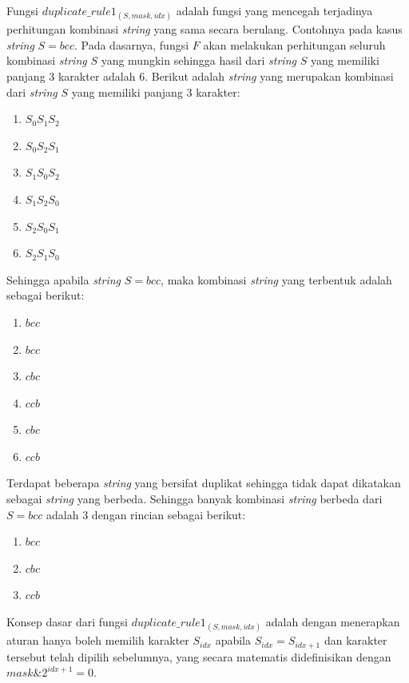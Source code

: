 Fungsi $ duplicate\_rule1_{(S, mask, idx)} $ adalah fungsi yang mencegah terjadinya perhitungan kombinasi \textit{string} yang sama secara berulang. Contohnya pada kasus \textit{string} $ S=bcc $. Pada dasarnya, fungsi $ F $ akan melakukan perhitungan seluruh kombinasi \textit{string} $ S $ yang mungkin sehingga hasil dari \textit{string} $ S $ yang memiliki panjang $ 3 $ karakter adalah $ 6 $. Berikut adalah \textit{string} yang merupakan kombinasi dari \textit{string} $ S $ yang memiliki panjang 3 karakter:
\begin{enumerate}
	\item $ S_{0}S_{1}S_{2} $
	\item $ S_{0}S_{2}S_{1} $
	\item $ S_{1}S_{0}S_{2} $
	\item $ S_{1}S_{2}S_{0} $
	\item $ S_{2}S_{0}S_{1} $
	\item $ S_{2}S_{1}S_{0} $
\end{enumerate}

Sehingga apabila \textit{string} $ S=bcc $, maka kombinasi \textit{string} yang terbentuk adalah sebagai berikut:
\begin{enumerate}
	\item $ bcc $
	\item $ bcc $
	\item $ cbc $
	\item $ ccb $
	\item $ cbc $
	\item $ ccb $
\end{enumerate}

Terdapat beberapa \textit{string} yang bersifat duplikat sehingga tidak dapat dikatakan sebagai \textit{string} yang berbeda. Sehingga banyak kombinasi \textit{string} berbeda dari $ S=bcc $ adalah $ 3 $ dengan rincian sebagai berikut:
\begin{enumerate}
	\item $ bcc $
	\item $ cbc $
	\item $ ccb $
\end{enumerate}

Konsep dasar dari fungsi $ duplicate\_rule1_{(S, mask, idx)} $ adalah dengan menerapkan aturan hanya boleh memilih karakter $ S_{idx} $ apabila $ S_{idx} = S_{idx+1} $ dan karakter tersebut telah dipilih sebelumnya, yang secara matematis didefinisikan dengan $ mask \& 2^{idx+1} = 0$.


